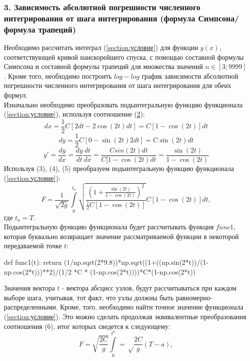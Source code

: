 \subsubsection{3. Зависимость абсолютной погрешности численного интегрирования от шага интегрирования (формула Симпсона/формула трапеций)}
Необходимо рассчитать интеграл (\ref{section:условие}) для функции $y(x)$, соответствующей кривой наискорейшего спуска, с помощью составной формулы Симпсона и составной формулы трапеций для множества значений $n \in [3;9999]$. Кроме того, необходимо построить $log-log$ график зависимости абсолютной погрешности численного интегрирования от шага интегрирования для обеих формул. \\
Изначально необходимо преобразовать подынтегральную функцию функционала (\ref{section:условие}), используя соотношение (\hyperlink{x}{2}):
\begin{equation}
    dx = \frac12C[2dt - 2\cos(2t)dt] = C[1-\cos(2t)]dt  
\end{equation}
\begin{equation}
    dy = \frac12C[0 - \sin(2t)2dt] = C\sin(2t)dt
\end{equation}
\begin{equation}
    y' = \frac{dy}{dx}=\frac{dy}{dt}\frac{dt}{dx}=
    \frac{Csin(2t)dt}{C[1-\cos(2t)dt}=\frac{\sin(2t)}{1-\cos(2t)}
\end{equation}
Используя (3), (4), (5) преобразуем подынтегральную функцию функционала (\ref{section:условие}):
\begin{equation}
    F = \frac{1}{\sqrt{2g}}\int\limits_0^{t_a}\sqrt{\frac{(1+\frac{\sin(2t)}{1-\cos(2t)})^2}{\frac12C[1-\cos(2t)]}}C[1-\cos(2t)]dt, 
\end{equation}
где $t_a = T$. \\
Подынтегральную функцию функционала будет рассчитывать функция $func1$, которая буквально возвращает значение рассматриваемой функции в некоторой передаваемой точке $t$:
\begin{python}
def func1(t):
  return (1/np.sqrt(2*9.8))*np.sqrt((1+((np.sin(2*t))/(1-np.cos(2*t)))**2)/(1/2 *C * (1-np.cos(2*t))))*C*(1-np.cos(2*t))
\end{python}
Значения вектора $t$ - вектора абсцисс узлов, будут рассчитываться при каждом выборе шага, учитывая, тот факт, что узлы должны быть равномерно-распределенными. 
Кроме, того, необходимо найти точное значение функционала (\ref{section:условие}). Это можно сделать продолжая эквивалентные преобразования соотношения (6), итог которых сведется к следующему:
\begin{equation}
    F = \sqrt{\frac{2C}{g}}\int\limits_0^{t^a}=\sqrt\frac{2C}{g}(T - a),
\end{equation}
